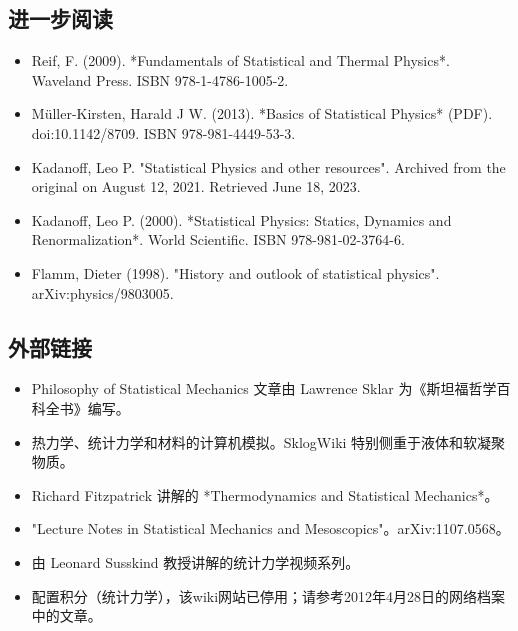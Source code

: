 \subsection{进一步阅读} 
\begin{itemize}
\item Reif, F. (2009). *Fundamentals of Statistical and Thermal Physics*. Waveland Press. ISBN 978-1-4786-1005-2.  
\item Müller-Kirsten, Harald J W. (2013). *Basics of Statistical Physics* (PDF). doi:10.1142/8709. ISBN 978-981-4449-53-3.  
\item Kadanoff, Leo P. "Statistical Physics and other resources". Archived from the original on August 12, 2021. Retrieved June 18, 2023.  
\item Kadanoff, Leo P. (2000). *Statistical Physics: Statics, Dynamics and Renormalization*. World Scientific. ISBN 978-981-02-3764-6.  
\item Flamm, Dieter (1998). "History and outlook of statistical physics". arXiv:physics/9803005.
\end{itemize}
\subsection{外部链接}
\begin{itemize}
\item Philosophy of Statistical Mechanics 文章由 Lawrence Sklar 为《斯坦福哲学百科全书》编写。  
\item 热力学、统计力学和材料的计算机模拟。SklogWiki 特别侧重于液体和软凝聚物质。  
\item Richard Fitzpatrick 讲解的 *Thermodynamics and Statistical Mechanics*。  
\item "Lecture Notes in Statistical Mechanics and Mesoscopics"。arXiv:1107.0568。  
\item 由 Leonard Susskind 教授讲解的统计力学视频系列。  
\item 配置积分（统计力学），该wiki网站已停用；请参考2012年4月28日的网络档案中的文章。
\end{itemize}